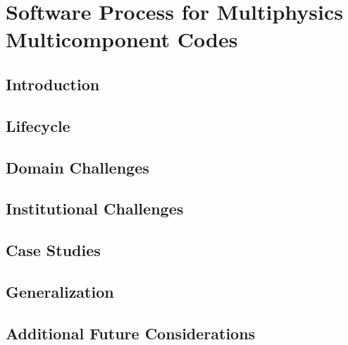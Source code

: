 \documentclass[sunil1]{sunil} %
\begin{document}

\chapter{Software Process for Multiphysics Multicomponent Codes}
\section {Introduction} 

\section{Lifecycle}

\section{Domain Challenges} 

\section{Institutional Challenges}

\section{Case Studies}
\label{sec:case-studies}


\section{Generalization} 

\section{Additional Future Considerations} 



\end{document}
